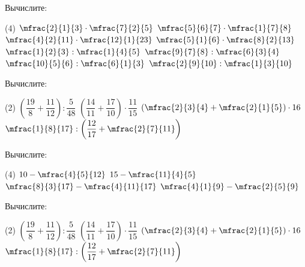 \begin{class}[number=2]
	\begin{listofex}
		\item Вычислите:
		\begin{tasks}(4)
			\task \( \mfrac{2}{1}{3}\cdot\mfrac{7}{2}{5} \)
			\task \( \mfrac{5}{6}{7}\cdot\mfrac{1}{7}{8} \)
			\task \( \mfrac{4}{2}{11}\cdot\mfrac{12}{1}{23} \)
			\task \( \mfrac{5}{1}{6}\cdot\mfrac{8}{2}{13} \)
			\task \( \mfrac{1}{2}{3}:\mfrac{1}{4}{5} \)
			\task \( \mfrac{9}{7}{8}:\mfrac{6}{3}{4} \)
			\task \( \mfrac{10}{5}{6}:\mfrac{6}{1}{3} \)
			\task \( \mfrac{2}{9}{10}:\mfrac{1}{3}{10} \)
		\end{tasks}
		\item Вычислите:
		\begin{tasks}(2)
			\task \( \left( \dfrac{19}{8}+\dfrac{11}{12} \right):\dfrac{5}{48} \)
			\task \( \left( \dfrac{14}{11}+\dfrac{17}{10} \right)\cdot\dfrac{11}{15} \)
			\task \( \left( \mfrac{2}{3}{4}+\mfrac{2}{1}{5} \right)\cdot16 \)
			\task \( \mfrac{1}{8}{17}:\left( \dfrac{12}{17}+\mfrac{2}{7}{11} \right) \)
		\end{tasks}
	\end{listofex}
\end{class}

\begin{homework}[number=1]
	\begin{listofex}
		\item Вычислите:
		\begin{tasks}(4)
			\task \( 10-\mfrac{4}{5}{12} \)
			\task \( 15-\mfrac{11}{4}{5} \)
			\task \( \mfrac{8}{3}{17}-\mfrac{4}{11}{17} \)
			\task \( \mfrac{4}{1}{9}-\mfrac{2}{5}{9} \)
		\end{tasks}
		\item Вычислите:
		\begin{tasks}(2)
			\task \( \left( \dfrac{19}{8}+\dfrac{11}{12} \right):\dfrac{5}{48} \)
			\task \( \left( \dfrac{14}{11}+\dfrac{17}{10} \right)\cdot\dfrac{11}{15} \)
			\task \( \left( \mfrac{2}{3}{4}+\mfrac{2}{1}{5} \right)\cdot16 \)
			\task \( \mfrac{1}{8}{17}:\left( \dfrac{12}{17}+\mfrac{2}{7}{11} \right) \)
		\end{tasks}
	\end{listofex}
\end{homework}

